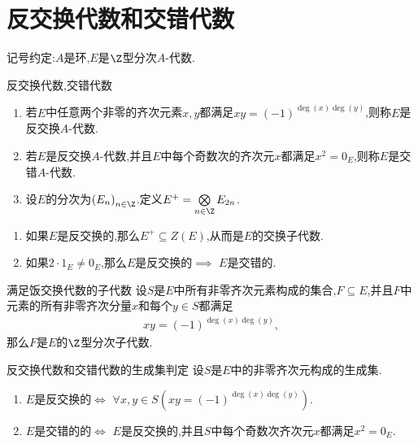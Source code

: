 \section{反交换代数和交错代数}

记号约定:$A$是环,$E$是$\Z$型分次$A$-代数.

\begin{definition}{反交换代数,交错代数}{}
	\begin{enumerate}
		\item 若$E$中任意两个非零的齐次元素$x,y$都满足$xy=\left(-1\right)^{\deg\left(x\right)\deg\left(y\right)}$,则称$E$是反交换$A$-代数.
		\item 若$E$是反交换$A$-代数,并且$E$中每个奇数次的齐次元$x$都满足$x^{2}=0_{E}$,则称$E$是交错$A$-代数.
		\item 设$E$的分次为$\left(E_{n}\right)_{n\in\Z}$.定义$E^{+}=\bigotimes\limits_{n\in\Z}E_{2n}$.
	\end{enumerate}
\end{definition}

\begin{remark}{}{}
	\begin{enumerate}
		\item 如果$E$是反交换的,那么$E^{+}\subseteq Z\left(E\right)$,从而是$E$的交换子代数.
		\item 如果$2\cdot 1_{E}\neq 0_{E}$,那么$E$是反交换的$\implies$ $E$是交错的.
	\end{enumerate}
\end{remark}

\begin{lemma}{满足饭交换代数的子代数}{}
	设$S$是$E$中所有非零齐次元素构成的集合,$F\subseteq E$,并且$F$中元素的所有非零齐次分量$x$和每个$y\in S$都满足
	\begin{align*}
		xy=\left(-1\right)^{\deg\left(x\right)\deg\left(y\right)},
	\end{align*}
	那么$F$是$E$的$\Z$型分次子代数.
\end{lemma}

\begin{proposition}{反交换代数和交错代数的生成集判定}{}
	设$S$是$E$中的非零齐次元构成的生成集.
	\begin{enumerate}
		\item $E$是反交换的$\iff$ $\forall x,y\in S\left(xy=\left(-1\right)^{\deg\left(x\right)\deg\left(y\right)}\right)$.
		\item $E$是交错的的$\iff$ $E$是反交换的,并且$S$中每个奇数次齐次元$x$都满足$x^{2}=0_{E}$.
	\end{enumerate}
\end{proposition}

